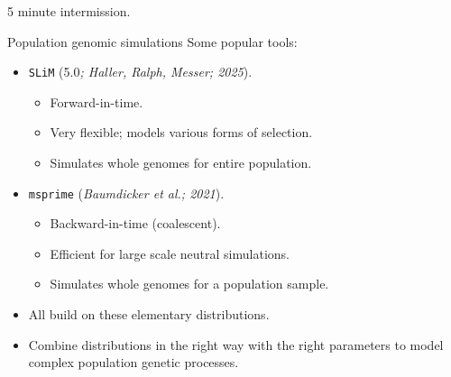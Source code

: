 \documentclass{beamer}
\newcommand{\1}{\ensuremath{\mathbf{1}}}
\begin{document}
%
%
%
\begin{frame}
    \begin{center}
        {\Large 5 minute intermission.}
    \end{center}
\end{frame}
%
%
%
\begin{frame}{Population genomic simulations}
    Some popular tools:
    \begin{itemize}
        \item \texttt{SLiM} (5.0\textit{; Haller, Ralph, Messer; 2025}).
        \begin{itemize}
            \item Forward-in-time.
            \item Very flexible; models various forms of selection.
            \item Simulates whole genomes for entire population.
        \end{itemize}
        \item \texttt{msprime} (\textit{Baumdicker et al.; 2021}).
        \begin{itemize}
            \item Backward-in-time (coalescent).
            \item Efficient for large scale neutral simulations.
            \item Simulates whole genomes for a population sample.
        \end{itemize}
    \end{itemize}
    \begin{block}{}
        \begin{itemize}
            \item All build on these elementary distributions.
            \item Combine distributions in the right way with the right parameters to model complex population genetic processes.
        \end{itemize}
    \end{block}
\end{frame}
%
%
%
\end{document}
